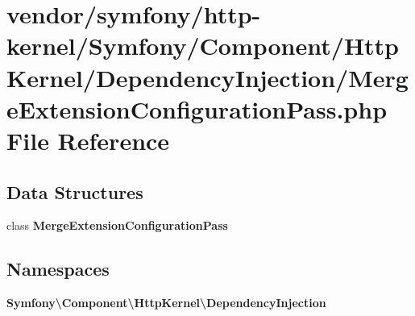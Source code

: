 \section{vendor/symfony/http-\/kernel/\+Symfony/\+Component/\+Http\+Kernel/\+Dependency\+Injection/\+Merge\+Extension\+Configuration\+Pass.php File Reference}
\label{_merge_extension_configuration_pass_8php}
\subsection*{Data Structures}
\begin{DoxyCompactItemize}
\item 
class {\bf Merge\+Extension\+Configuration\+Pass}
\end{DoxyCompactItemize}
\subsection*{Namespaces}
\begin{DoxyCompactItemize}
\item 
 {\bf Symfony\textbackslash{}\+Component\textbackslash{}\+Http\+Kernel\textbackslash{}\+Dependency\+Injection}
\end{DoxyCompactItemize}
